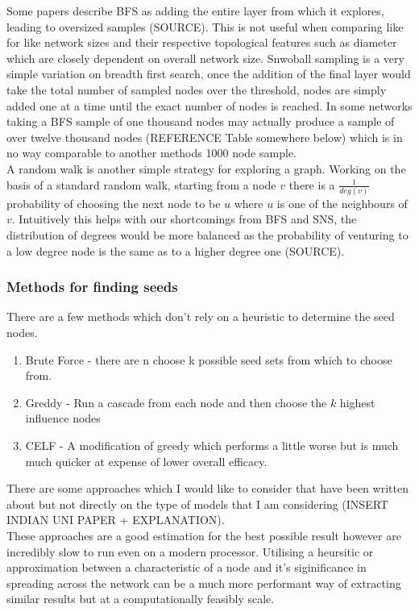 \documentclass{article}
\begin{document}
Some papers describe BFS as adding the entire layer from which it explores, leading to oversized samples (SOURCE).
This is not useful when comparing like for like network sizes and their respective topological features such as diameter which are closely dependent on overall network size.
Snwoball sampling is a very simple variation on breadth first search,
once the addition of the final layer would take the total number of sampled nodes over the threshold, nodes are simply added one at a time until the exact number of nodes is reached.
In some networks taking a BFS sample of one thousand nodes may actually produce a sample of over twelve thousand nodes (REFERENCE Table somewhere below) which is in no way comparable to another methods 1000 node sample.
\\

A random walk is another simple strategy for exploring a graph.
Working on the basis of a standard random walk, starting from a node $v$ there is a $\frac{1}{deg(v)}$ probability of choosing the next node to be $u$ where $u$ is one of the neighbours of $v$.
Intuitively this helps with our shortcomings from BFS and SNS, the distribution of degrees would be more balanced as the probability of venturing to a low degree node is the same as to a higher degree one (SOURCE).

\subsubsection{Methods for finding seeds}
There are a few methods which don't rely on a heuristic to determine the seed nodes.

\begin{enumerate}
	\item Brute Force - there are n choose k possible seed sets from which to choose from.
	\item Greddy - Run a cascade from each node and then choose the $k$ highest influence nodes
	\item CELF - A modification of greedy which performs a little worse but is much much quicker at expense of lower overall efficacy.
\end{enumerate}

There are some approaches which I would like to consider that have been written about but not directly on the type of models that I am considering (INSERT INDIAN UNI PAPER + EXPLANATION).
\\

These approaches are a good estimation for the best possible result however are incredibly slow to run even on a modern processor.
Utilising a heursitic or approximation between a characteristic of a node and it's siginificance in spreading across the network can be a much more performant way of extracting similar results but at a computationally feasibly scale.
\end{document}
